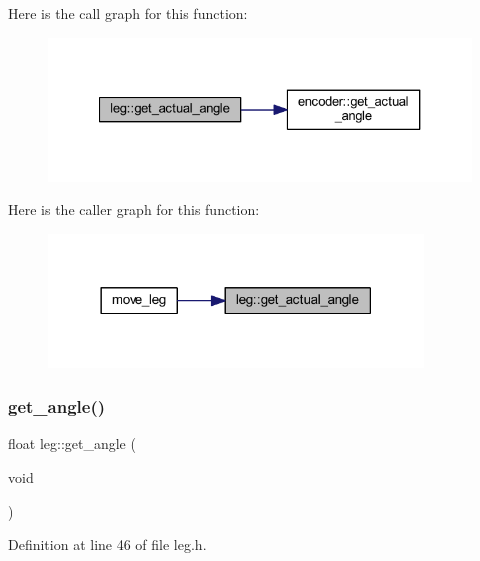Here is the call graph for this function\+:
\nopagebreak
\begin{figure}[H]
\begin{center}
\leavevmode
\includegraphics[width=327pt]{classleg_afcbf0d3a49ba8e092529f74364321e54_cgraph}
\end{center}
\end{figure}
Here is the caller graph for this function\+:
\nopagebreak
\begin{figure}[H]
\begin{center}
\leavevmode
\includegraphics[width=282pt]{classleg_afcbf0d3a49ba8e092529f74364321e54_icgraph}
\end{center}
\end{figure}
\mbox{\label{classleg_a0f98905721d2f20536b7dc908597263e}} 
\subsubsection{\texorpdfstring{get\_angle()}{get\_angle()}}
{\footnotesize\ttfamily float leg\+::get\+\_\+angle (\begin{DoxyParamCaption}\item[{void}]{ }\end{DoxyParamCaption})\hspace{0.3cm}{\ttfamily [inline]}}



Definition at line 46 of file leg.\+h.


